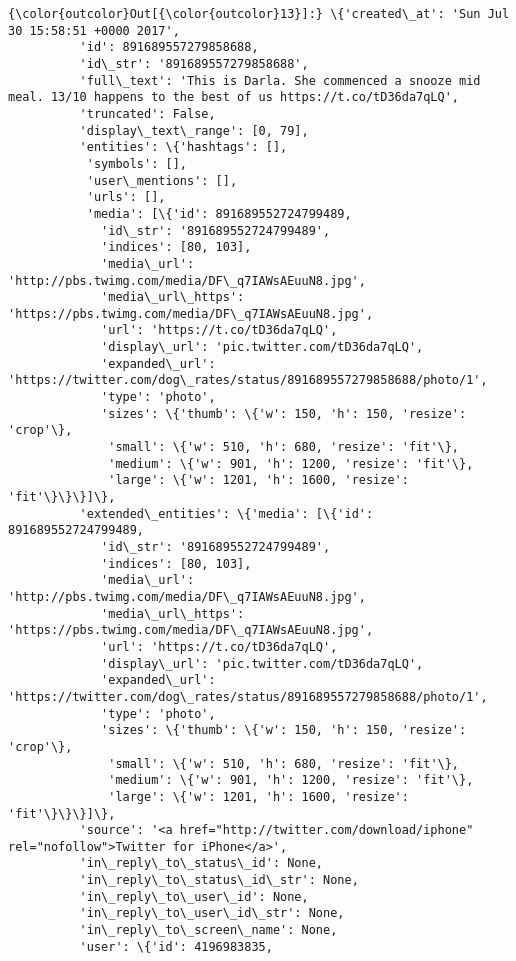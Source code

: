 \documentclass[11pt]{article}
\begin{document}
\begin{Verbatim}[commandchars=\\\{\}]
{\color{outcolor}Out[{\color{outcolor}13}]:} \{'created\_at': 'Sun Jul 30 15:58:51 +0000 2017',
          'id': 891689557279858688,
          'id\_str': '891689557279858688',
          'full\_text': 'This is Darla. She commenced a snooze mid meal. 13/10 happens to the best of us https://t.co/tD36da7qLQ',
          'truncated': False,
          'display\_text\_range': [0, 79],
          'entities': \{'hashtags': [],
           'symbols': [],
           'user\_mentions': [],
           'urls': [],
           'media': [\{'id': 891689552724799489,
             'id\_str': '891689552724799489',
             'indices': [80, 103],
             'media\_url': 'http://pbs.twimg.com/media/DF\_q7IAWsAEuuN8.jpg',
             'media\_url\_https': 'https://pbs.twimg.com/media/DF\_q7IAWsAEuuN8.jpg',
             'url': 'https://t.co/tD36da7qLQ',
             'display\_url': 'pic.twitter.com/tD36da7qLQ',
             'expanded\_url': 'https://twitter.com/dog\_rates/status/891689557279858688/photo/1',
             'type': 'photo',
             'sizes': \{'thumb': \{'w': 150, 'h': 150, 'resize': 'crop'\},
              'small': \{'w': 510, 'h': 680, 'resize': 'fit'\},
              'medium': \{'w': 901, 'h': 1200, 'resize': 'fit'\},
              'large': \{'w': 1201, 'h': 1600, 'resize': 'fit'\}\}\}]\},
          'extended\_entities': \{'media': [\{'id': 891689552724799489,
             'id\_str': '891689552724799489',
             'indices': [80, 103],
             'media\_url': 'http://pbs.twimg.com/media/DF\_q7IAWsAEuuN8.jpg',
             'media\_url\_https': 'https://pbs.twimg.com/media/DF\_q7IAWsAEuuN8.jpg',
             'url': 'https://t.co/tD36da7qLQ',
             'display\_url': 'pic.twitter.com/tD36da7qLQ',
             'expanded\_url': 'https://twitter.com/dog\_rates/status/891689557279858688/photo/1',
             'type': 'photo',
             'sizes': \{'thumb': \{'w': 150, 'h': 150, 'resize': 'crop'\},
              'small': \{'w': 510, 'h': 680, 'resize': 'fit'\},
              'medium': \{'w': 901, 'h': 1200, 'resize': 'fit'\},
              'large': \{'w': 1201, 'h': 1600, 'resize': 'fit'\}\}\}]\},
          'source': '<a href="http://twitter.com/download/iphone" rel="nofollow">Twitter for iPhone</a>',
          'in\_reply\_to\_status\_id': None,
          'in\_reply\_to\_status\_id\_str': None,
          'in\_reply\_to\_user\_id': None,
          'in\_reply\_to\_user\_id\_str': None,
          'in\_reply\_to\_screen\_name': None,
          'user': \{'id': 4196983835,

\end{Verbatim}
\end{document}
